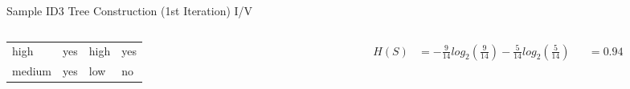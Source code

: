 \documentclass[document.tex]{subfiles}
\begin{document}
\begin{frame}{Sample ID3 Tree Construction (1st Iteration) I/V}
\begin{columns}
\begin{column}{0.4\textwidth}
\begin{table}
{\begin{tabular}{llll}
                            \rowcolor{LightGreen}
                            high &   yes &        high &    yes \\
                            \rowcolor{LightRed}
                            medium &   yes &         low &     no \\
                            \bottomrule
                        \end{tabular}
                    }
                \end{table}
            \end{column}
            \begin{column}{0.6\textwidth}
                \begin{alignat*}{3}
                H(S) &= -\frac{9}{14}log_2(\frac{9}{14}) - \frac{5}{14}log_2(\frac{5}{14}) &&= 0.94
                \end{alignat*}
            \end{column}
        \end{columns}
    \end{frame}
\end{document}
